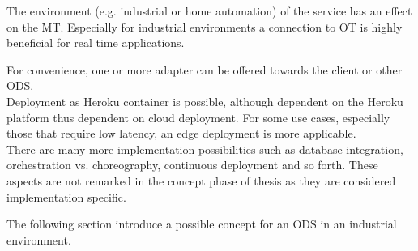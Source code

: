 The environment (e.g. industrial or home automation) of the service has an effect on the MT. Especially for industrial environments a connection to OT is highly beneficial for real time applications. 

For convenience, one or more adapter can be offered towards the client or other ODS. \\

Deployment as Heroku container is possible, although dependent on the Heroku platform thus dependent on cloud deployment. For some use cases, especially those that require low latency, an edge deployment is more applicable. \\

There are many more implementation possibilities such as database integration, orchestration vs. choreography, continuous deployment and so forth. These aspects are not remarked in the concept phase of thesis as they are considered implementation specific.

The following section introduce a possible concept for an ODS in an industrial environment.